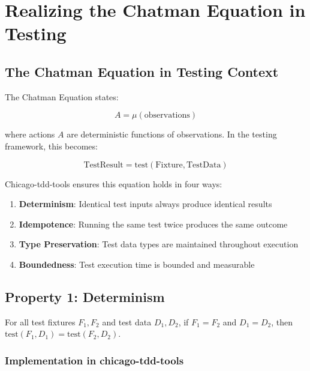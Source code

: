 \chapter{Realizing the Chatman Equation in Testing}

\section{The Chatman Equation in Testing Context}

The Chatman Equation states:

\begin{equation}
A = \mu(\text{observations})
\end{equation}

where actions $A$ are deterministic functions of observations. In the testing framework, this
becomes:

\begin{equation}
\text{TestResult} = \text{test}(\text{Fixture}, \text{TestData})
\end{equation}

Chicago-tdd-tools ensures this equation holds in four ways:

\begin{enumerate}
  \item \textbf{Determinism}: Identical test inputs always produce identical results
  \item \textbf{Idempotence}: Running the same test twice produces the same outcome
  \item \textbf{Type Preservation}: Test data types are maintained throughout execution
  \item \textbf{Boundedness}: Test execution time is bounded and measurable
\end{enumerate}

\section{Property 1: Determinism}

\begin{theorem}
For all test fixtures $F_1, F_2$ and test data $D_1, D_2$, if $F_1 = F_2$ and $D_1 = D_2$,
then $\text{test}(F_1, D_1) = \text{test}(F_2, D_2)$.
\end{theorem}

\subsection{Implementation in chicago-tdd-tools}

